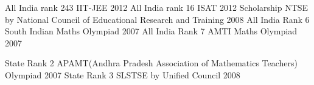 \begin{cvhonors}
  \cvhonor
    {All India rank 243}
    {IIT-JEE}
    {}
    {2012}
  \cvhonor
    {All India rank 16}
    {ISAT}
    {}
    {2012}
  \cvhonor
    {Scholarship}
    {NTSE by National Council of Educational Research and Training}
    {}
    {2008}
  \cvhonor
    {All India Rank 6}
    {South Indian Maths Olympiad}
    {}
    {2007}
  \cvhonor
    {All India Rank 7}
    {AMTI Maths Olympiad}
    {}
    {2007}
\end{cvhonors}

\begin{cvhonors}
  \cvhonor
    {State Rank 2}
    {APAMT(Andhra Pradesh Association of Mathematics Teachers) Olympiad}
    {}
    {2007}
  \cvhonor
    {State Rank 3}
    {SLSTSE by Unified Council}
    {}
    {2008}
\end{cvhonors}

